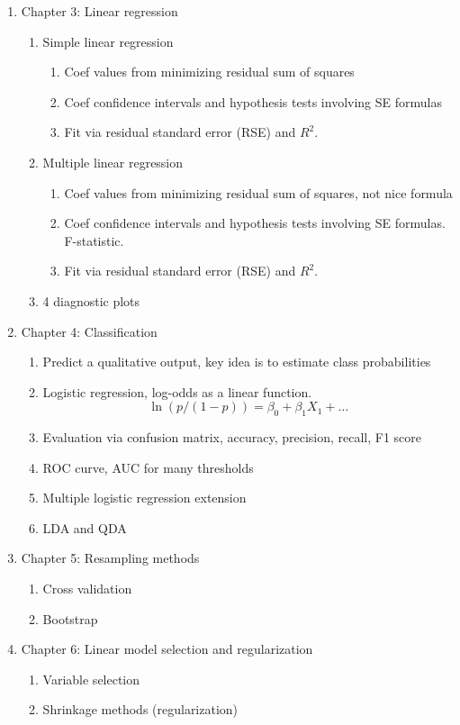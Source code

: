 \documentclass{article}
\begin{document}
\begin{enumerate}
\item Chapter 3: Linear regression
\begin{enumerate}
\item Simple linear regression 
\begin{enumerate}
\item Coef values from minimizing residual sum of squares
\item Coef confidence intervals and hypothesis tests involving SE formulas
\item Fit via residual standard error (RSE) and $R^2$.
\end{enumerate}
\item Multiple linear regression 
\begin{enumerate}
\item Coef values from minimizing residual sum of squares, not nice formula
\item Coef confidence intervals and hypothesis tests involving SE formulas. F-statistic.
\item Fit via residual standard error (RSE) and $R^2$.
\end{enumerate}
\item 4 diagnostic plots
\end{enumerate}

\item Chapter 4: Classification
\begin{enumerate}
\item Predict a qualitative output, key idea is to estimate class probabilities
\item Logistic regression, log-odds as a linear function.
\[
\ln(p/(1-p)) = \beta_0 + \beta_1 X_1 + \dots
\]
\item Evaluation via confusion matrix, accuracy, precision, recall, F1 score
\item ROC curve, AUC for many thresholds
\item Multiple logistic regression extension
\item LDA and QDA
\end{enumerate}

\item Chapter 5: Resampling methods
\begin{enumerate}
\item Cross validation
\item Bootstrap 
\end{enumerate}

\item Chapter 6: Linear model selection and regularization
\begin{enumerate}
\item Variable selection
\item Shrinkage methods (regularization)
\end{enumerate}
\end{enumerate}
\end{document}
